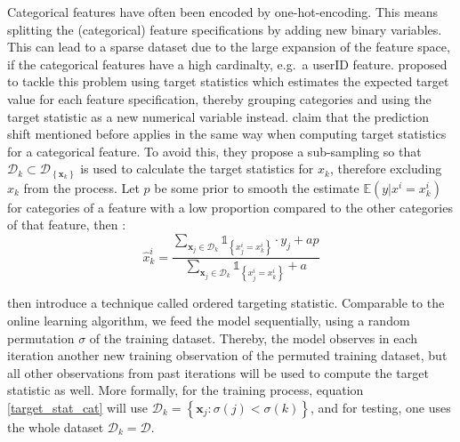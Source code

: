 \documentclass[12pt,a4paper]{article}
\begin{document}
Categorical features have often been encoded by one-hot-encoding. This means splitting the (categorical) feature specifications by adding new binary variables. This can lead to a sparse dataset due to the large expansion of the feature space, if the categorical features have a high cardinalty, e.g.~a userID feature. \textcite{MicciBarreca2001} proposed to tackle this problem using target statistics which estimates the expected target value for each feature specification, thereby grouping categories and using the target statistic as a new numerical variable instead. \textcite{Prokhorenkova2019} claim that the prediction shift mentioned before applies in the same way when computing target statistics for a categorical feature. To avoid this, they propose a sub-sampling so that \(\mathcal{D}_{k}\subset\mathcal{D}_{\left\{\mathbf{x}_{k}\right\}}\) is used to calculate the target statistics for \(x_k\), therefore excluding \(x_k\) from the process. Let \(p\) be some prior to smooth the estimate \(\mathbb{E}(y|x^i=x^i_k)\) for categories of a feature with a low proportion compared to the other categories of that feature, then :
\begin{equation}
\hat{x}_{k}^{i}=\frac{\sum_{\mathbf{x}_{j} \in \mathcal{D}_{k}} \mathbb{1}_{\left\{x_{j}^{i}=x_{k}^{i}\right\}} \cdot y_{j}+a p}{\sum_{\mathbf{x}_{j} \in \mathcal{D}_{k}} \mathbb{1}_{\left\{x_{j}^{i}=x_{k}^{i}\right\}}+a}
\label{target_stat_cat}
\end{equation}

\textcite{Prokhorenkova2019} then introduce a technique called ordered targeting statistic. Comparable to the online learning algorithm, we feed the model sequentially, using a random permutation \(\sigma\) of the training dataset. Thereby, the model observes in each iteration another new training observation of the permuted training dataset, but all other observations from past iterations will be used to compute the target statistic as well. More formally, for the training process, equation \ref{target_stat_cat} will use \(\mathcal{D}_{k}=\left\{\mathbf{x}_{j}: \sigma(j)<\sigma(k)\right\}\), and for testing, one uses the whole dataset \(\mathcal{D}_{k}=\mathcal{D}\).
\end{document}
